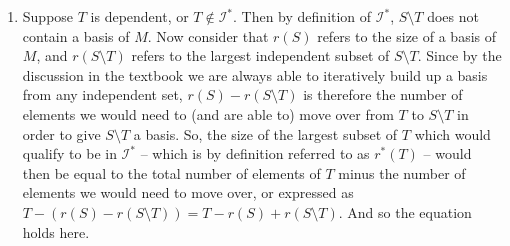\documentclass{article}
\begin{document}
\begin{enumerate}[label=(\alph*),topsep=0pt,itemsep=1ex,partopsep=1ex,parsep=1ex]
\begin{enumerate}[label=(\arabic*),topsep=0pt,itemsep=1ex,partopsep=1ex,parsep=1ex]
    \item Suppose $T$ is dependent, or $T \not \in \mathcal{I}^*$. Then by definition of $\mathcal{I}^*$, $S \setminus T$ does not contain a basis of $M$. Now consider that $r(S)$ refers to the size of a basis of $M$, and $r(S \setminus T)$ refers to the largest independent subset of $S \setminus T$. Since by the discussion in the textbook we are always able to iteratively build up a basis from any independent set, $r(S) - r(S \setminus T)$ is therefore the number of elements we would need to (and are able to) move over from $T$ to $S \setminus T$ in order to give $S \setminus T$ a basis. So, the size of the largest subset of $T$ which would qualify to be in $\mathcal{I}^*$ -- which is by definition referred to as $r^*(T)$ -- would then be equal to the total number of elements of $T$ minus the number of elements we would need to move over, or expressed as $T - (r(S) - r(S \setminus T)) = T - r(S) + r(S \setminus T)$. And so the equation holds here.

\end{enumerate}

\end{enumerate}
\end{document}
